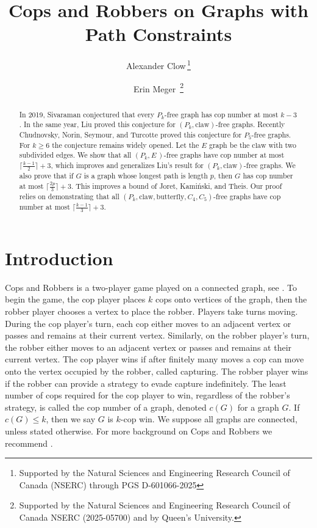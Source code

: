 \documentclass[12pt]{article}
\title{Cops and Robbers on Graphs with Path Constraints}
\author[1]{Alexander Clow\,\thanks{Supported by the Natural Sciences and Engineering Research Council of Canada (NSERC) through PGS D-601066-2025}}
\author[2]{Erin Meger\, \thanks{Supported by  the Natural Sciences and Engineering Research Council of Canada NSERC (2025-05700) and by Queen’s University.}}
\date{}
\affil[1]{ \small{Department of Mathematics, Simon Fraser University}}
\affil[2]{ \small{School of Computing, Queens University}}
\theoremstyle{definition}
\def\claw{\text{claw}}
\def\butterfly{\text{butterfly}}
\def\E{\textit{E}}
\begin{document}
\maketitle

\begin{abstract}
    In 2019, Sivaraman conjectured that every $P_k$-free graph has cop number at most $k-3$.
    In the same year, Liu proved this conjecture for $(P_k,\claw)$-free graphs.
    Recently Chudnovsky, Norin, Seymour, and Turcotte proved this conjecture for $P_5$-free graphs.
    For $k\geq 6$ the conjecture remains widely opened.
    Let the $\E$ graph be the $\claw$ with two subdivided edges.
    We show that all $(P_k,\E \,)$-free graphs have cop number at most $\lceil \frac{k-1}{2} \rceil +3$, 
    which improves and generalizes Liu's result for $(P_k,\claw)$-free graphs.
    We also prove that if $G$ is a graph whose longest path is length $p$, then 
    $G$ has cop number at most $\lceil \frac{2p}{3} \rceil+3$.
    This improves a bound of Joret, Kami\'nski, and Theis.
    Our proof relies on demonstrating that all $(P_k,\claw,\butterfly,C_4,C_5)$-free graphs have cop number at most $\lceil\frac{k-1}{3}\rceil +3$.
\end{abstract}



\section{Introduction}

Cops and Robbers is a two-player game played on a connected graph, see \cite{AIGNER1984, nowakowski1983vertex,quilliot1983problemes}. 
To begin the game, the cop player places $k$ cops onto vertices of the graph,
then the robber player chooses a vertex to place the robber. 
Players take turns moving. 
During the cop player’s turn, each cop either moves to an adjacent vertex or passes and remains at their current vertex. 
Similarly, on the robber player’s turn, the robber either moves to an adjacent vertex or passes and remains at their current vertex.
The cop player wins if after finitely many moves a cop can move onto the vertex occupied by the robber, called capturing.
The robber player wins if the robber can provide a strategy to evade capture indefinitely. 
The least number of cops required for the cop player to win, regardless of the robber’s strategy, is called  the cop number of a graph, denoted $c(G)$ for a graph $G$.
If $c(G)\leq k$, then we say $G$ is $k$-cop win.
We suppose all graphs are connected, unless stated otherwise.
For more background on Cops and Robbers we recommend \cite{bonato2011game}.
\end{document}
